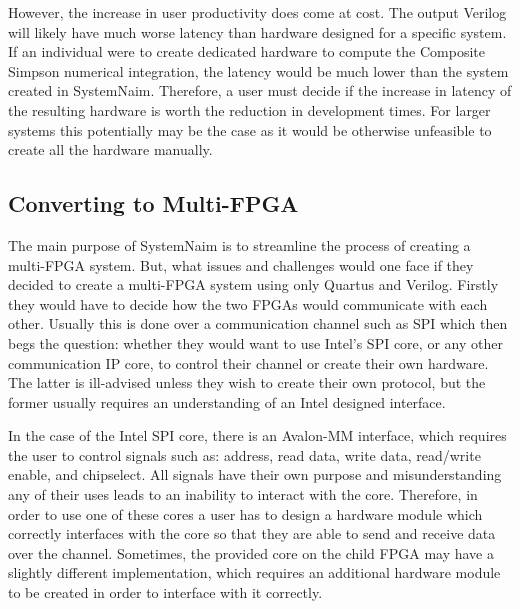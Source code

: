 However, the increase in user productivity does come at cost. The output Verilog will likely have much worse latency than hardware designed for a specific system. If an individual were to create dedicated hardware to compute the Composite Simpson numerical integration, the latency would be much lower than the system created in SystemNaim. Therefore, a user must decide if the increase in latency of the resulting hardware is worth the reduction in development times. For larger systems this potentially may be the case as it would be otherwise unfeasible to create all the hardware manually.

\subsection{Converting to Multi-FPGA}

The main purpose of SystemNaim is to streamline the process of creating a multi-FPGA system. But, what issues and challenges would one face if they decided to create a multi-FPGA system using only Quartus and Verilog. Firstly they would have to decide how the two FPGAs would communicate with each other. Usually this is done over a communication channel such as SPI which then begs the question: whether they would want to use Intel's SPI core, or any other communication IP core, to control their channel or create their own hardware. The latter is ill-advised unless they wish to create their own protocol, but the former usually requires an understanding of an Intel designed interface.

In the case of the Intel SPI core, there is an Avalon-MM interface, which requires the user to control signals such as: address, read data, write data, read/write enable, and chipselect. All signals have their own purpose and misunderstanding any of their uses leads to an inability to interact with the core. Therefore, in order to use one of these cores a user has to design a hardware module which correctly interfaces with the core so that they are able to send and receive data over the channel. Sometimes, the provided core on the child FPGA may have a slightly different implementation, which requires an additional hardware module to be created in order to interface with it correctly.

